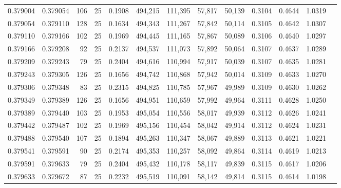 \begin{tabular}{rrrrrrrrrrrrr}
0.379004 & 0.379054 &   106 &  25 &                                     0.1908 & 494,215 & 111,395 &  57,817 &  50,139 & 0.3104 & 0.4644 & 1.0319 \\
0.379054 & 0.379110 &   128 &  25 &                                     0.1634 & 494,343 & 111,267 &  57,842 &  50,114 & 0.3105 & 0.4642 & 1.0307 \\
0.379110 & 0.379166 &   102 &  25 &                                     0.1969 & 494,445 & 111,165 &  57,867 &  50,089 & 0.3106 & 0.4640 & 1.0297 \\
0.379166 & 0.379208 &    92 &  25 &                                     0.2137 & 494,537 & 111,073 &  57,892 &  50,064 & 0.3107 & 0.4637 & 1.0289 \\
0.379209 & 0.379243 &    79 &  25 &                                     0.2404 & 494,616 & 110,994 &  57,917 &  50,039 & 0.3107 & 0.4635 & 1.0281 \\
0.379243 & 0.379305 &   126 &  25 &                                     0.1656 & 494,742 & 110,868 &  57,942 &  50,014 & 0.3109 & 0.4633 & 1.0270 \\
0.379306 & 0.379348 &    83 &  25 &                                     0.2315 & 494,825 & 110,785 &  57,967 &  49,989 & 0.3109 & 0.4630 & 1.0262 \\
0.379349 & 0.379389 &   126 &  25 &                                     0.1656 & 494,951 & 110,659 &  57,992 &  49,964 & 0.3111 & 0.4628 & 1.0250 \\
0.379389 & 0.379440 &   103 &  25 &                                     0.1953 & 495,054 & 110,556 &  58,017 &  49,939 & 0.3112 & 0.4626 & 1.0241 \\
0.379442 & 0.379487 &   102 &  25 &                                     0.1969 & 495,156 & 110,454 &  58,042 &  49,914 & 0.3112 & 0.4624 & 1.0231 \\
0.379488 & 0.379540 &   107 &  25 &                                     0.1894 & 495,263 & 110,347 &  58,067 &  49,889 & 0.3113 & 0.4621 & 1.0221 \\
0.379541 & 0.379591 &    90 &  25 &                                     0.2174 & 495,353 & 110,257 &  58,092 &  49,864 & 0.3114 & 0.4619 & 1.0213 \\
0.379591 & 0.379633 &    79 &  25 &                                     0.2404 & 495,432 & 110,178 &  58,117 &  49,839 & 0.3115 & 0.4617 & 1.0206 \\
0.379633 & 0.379672 &    87 &  25 &                                     0.2232 & 495,519 & 110,091 &  58,142 &  49,814 & 0.3115 & 0.4614 & 1.0198 \\

\end{tabular}
